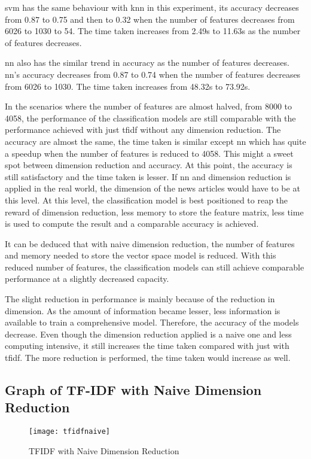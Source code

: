 \Ac{svm} has the same behaviour with \ac{knn} in this experiment, its accuracy decreases from 0.87 to 0.75 and then to 0.32 when the number of features decreases from 6026 to 1030 to 54. The time taken increases from 2.49s to 11.63s as the number of features decreases.

\Ac{nn} also has the similar trend in accuracy as the number of features decreases. \Ac{nn}'s accuracy decreases from 0.87 to 0.74 when the number of features decreases from 6026 to 1030. The time taken increases from 48.32s to 73.92s.

In the scenarios where the number of features are almost halved, from 8000 to 4058, the performance of the classification models are still comparable with the performance achieved with just \ac{tfidf} without any dimension reduction. The accuracy are almost the same, the time taken is similar except \ac{nn} which has quite a speedup when the number of features is reduced to 4058. This might a sweet spot between dimension reduction and accuracy. At this point, the accuracy is still satisfactory and the time taken is lesser. If \ac{nn} and dimension reduction is applied in the real world, the dimension of the news articles would have to be at this level. At this level, the classification model is best positioned to reap the reward of dimension reduction, less memory to store the feature matrix, less time is used to compute the result and a comparable accuracy is achieved.

It can be deduced that with naive dimension reduction, the number of features and memory needed to store the vector space model is reduced. With this reduced number of features, the classification models can still achieve comparable performance at a slightly decreased capacity.

The slight reduction in performance is mainly because of the reduction in dimension. As the amount of information became lesser, less information is available to train a comprehensive model. Therefore, the accuracy of the models decrease. Even though the dimension reduction applied is a naive one and less computing intensive, it still increases the time taken compared with just with \ac{tfidf}. The more reduction is performed, the time taken would increase as well.\\

\subsection{Graph of TF-IDF with Naive Dimension Reduction}
\begin{figure} [H]
	\centering
	\texttt{[image: tfidfnaive]}
	\caption{TFIDF with Naive Dimension Reduction}
	\label{fig:tfidfnaive}
\end{figure}

